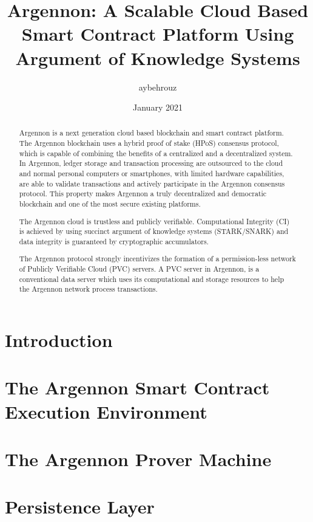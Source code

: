 \documentclass[11pt, a4paper]{report}
\title{Argennon: A Scalable Cloud Based Smart Contract Platform Using Argument of Knowledge Systems}
\author{aybehrouz}
\date{January 2021}
\begin{document}
    \maketitle
    \begin{abstract}
        Argennon is a next generation cloud based blockchain and smart
        contract platform. The Argennon blockchain uses
        a hybrid proof of stake (HPoS) consensus protocol, which is capable of combining the benefits of
        a centralized and a decentralized system. In Argennon, ledger storage and transaction processing are
        outsourced to the cloud and normal personal computers or smartphones, with limited hardware
        capabilities, are able to validate transactions and actively
        participate in the Argennon consensus protocol. This property makes Argennon a truly decentralized and
        democratic blockchain and one of the most secure existing platforms.

        The Argennon cloud is trustless and publicly verifiable. Computational Integrity (CI) is
        achieved by using succinct argument of knowledge systems (STARK/SNARK)
        and data integrity is guaranteed by cryptographic accumulators.

        The Argennon protocol strongly incentivizes the formation of a permission-less network of Publicly Verifiable
        Cloud (PVC) servers. A PVC server in Argennon, is a conventional data server which uses its computational and
        storage resources to help the Argennon network process transactions.
    \end{abstract}
    \tableofcontents


    \chapter{Introduction}\label{ch:intro}
    

    \chapter{The Argennon Smart Contract Execution Environment}\label{ch:AscEE}
    

    \chapter{The Argennon Prover Machine}\label{ch:APM}
    


    \chapter{Persistence Layer}\label{ch:persistance}
    
\end{document}
